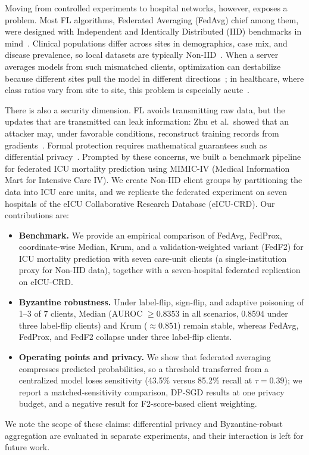 \documentclass[journal]{IEEEtran}
\begin{document}
Moving from controlled experiments to hospital networks, however, exposes a problem. Most FL algorithms, Federated Averaging (FedAvg) chief among them, were designed with Independent and Identically Distributed (IID) benchmarks in mind~\cite{li2020federated_challenges}. Clinical populations differ across sites in demographics, case mix, and disease prevalence, so local datasets are typically Non-IID~\cite{zhao2018federated}. When a server averages models from such mismatched clients, optimization can destabilize because different sites pull the model in different directions~\cite{fedprox, scaffold}; in healthcare, where class ratios vary from site to site, this problem is especially acute~\cite{li2020federated}.

There is also a security dimension. FL avoids transmitting raw data, but the updates that are transmitted can leak information: Zhu et al.\ showed that an attacker may, under favorable conditions, reconstruct training records from gradients~\cite{zhu2019deep}. Formal protection requires mathematical guarantees such as differential privacy~\cite{dwork2014algorithmic, abadi2016deep}. Prompted by these concerns, we built a benchmark pipeline for federated ICU mortality prediction using MIMIC-IV (Medical Information Mart for Intensive Care IV). We create Non-IID client groups by partitioning the data into ICU care units, and we replicate the federated experiment on seven hospitals of the eICU Collaborative Research Database (eICU-CRD). Our contributions are:
\begin{itemize}
\item \textbf{Benchmark.} We provide an empirical comparison of FedAvg, FedProx, coordinate-wise Median, Krum, and a validation-weighted variant (FedF2) for ICU mortality prediction with seven care-unit clients (a single-institution proxy for Non-IID data), together with a seven-hospital federated replication on eICU-CRD.
\item \textbf{Byzantine robustness.} Under label-flip, sign-flip, and adaptive poisoning of 1--3 of 7 clients, Median (AUROC $\geq 0.8353$ in all scenarios, 0.8594 under three label-flip clients) and Krum ($\approx 0.851$) remain stable, whereas FedAvg, FedProx, and FedF2 collapse under three label-flip clients.
\item \textbf{Operating points and privacy.} We show that federated averaging compresses predicted probabilities, so a threshold transferred from a centralized model loses sensitivity (43.5\% versus 85.2\% recall at $\tau=0.39$); we report a matched-sensitivity comparison, DP-SGD results at one privacy budget, and a negative result for F2-score-based client weighting.
\end{itemize}
We note the scope of these claims: differential privacy and Byzantine-robust aggregation are evaluated in separate experiments, and their interaction is left for future work.
\end{document}

